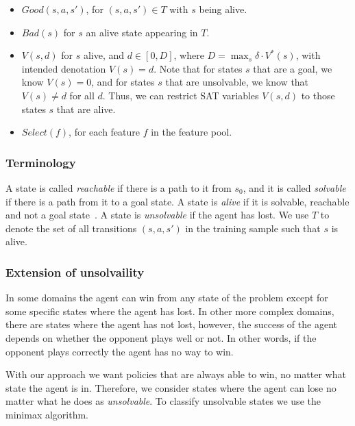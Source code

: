 \documentclass[a4paper]{article}
\newcommand{\badtx}{\ensuremath{\mathrm{BAD}}}
\begin{document}
\begin{itemize}
 \item $Good(s, a, s')$, for $(s, a, s') \in T$ with $s$ being alive.

 \item $Bad(s)$ for $s$ an alive state appearing in $T$.


 \item $V(s, d)$ for $s$ alive, and $d \in [0, D]$, where $D = \max_{s} \delta \cdot V^*(s)$,
 with intended denotation $V(s)=d$.
 Note that for states $s$ that are a goal, we know $V(s)=0$,
 and for states $s$ that are unsolvable, we know that $V(s) \neq d$ for all $d$.
 Thus, we can restrict SAT variables $V(s, d)$ to those states $s$ that are alive.

 \item $Select(f)$, for each feature $f$ in the feature pool.
\end{itemize}


\subsubsection{Terminology}

A state is called \emph{reachable} if there is a path to it from $s_0$, and it is called \emph{solvable} if there is a path from it to a goal state. A state is \emph{alive} if it is solvable, reachable and not a goal state~\cite{frances-et-al-ijcai2019}. A state is \emph{unsolvable} if the agent has lost. We use $T$ to denote the set of all transitions $(s, a, s')$ in the training sample such that $s$ is alive.

\subsubsection{Extension of unsolvaility}

In some domains the agent can win from any state of the problem except for some specific states where the agent has lost. In other more complex domains, there are states where the agent has not lost, however, the success of the agent depends on whether the opponent plays well or not. In other words, if the opponent plays correctly the agent has no way to win.

With our approach we want policies that are always able to win, no matter what state the agent is in. Therefore, we consider states where the agent can lose no matter what he does as \emph{unsolvable}. To classify unsolvable states we use the minimax algorithm.
\end{document}
